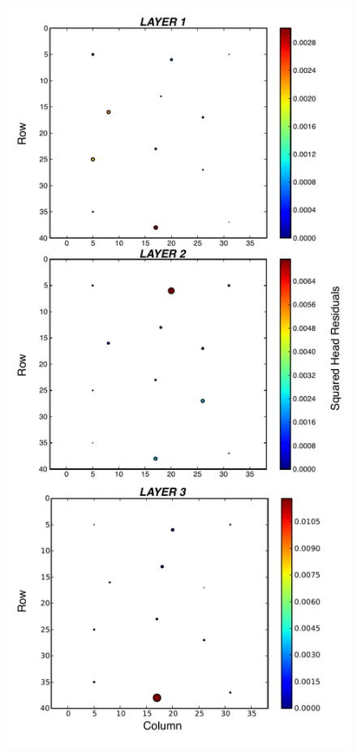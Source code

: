 \documentclass[11pt,oneside,onecolumn]{usgsreport}
\begin{document}
\begin{appendix}
\begin{figure}[!t]
\begin{center}\includegraphics[scale=0.5]{figures/3L_resid_case6}\end{center}


\end{figure}
\end{appendix}
\end{document}
